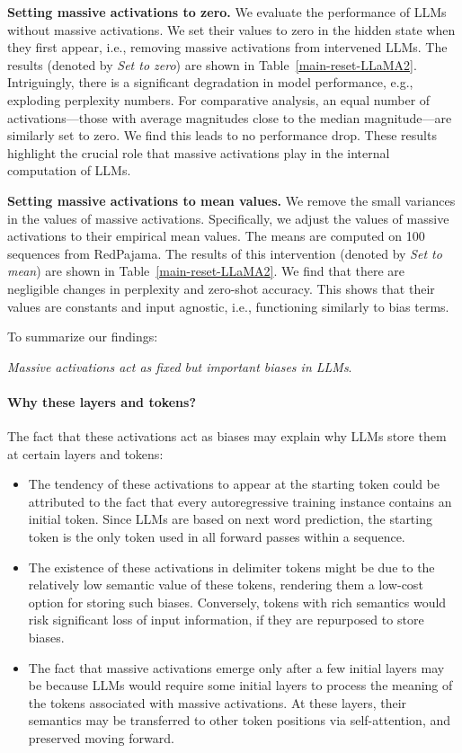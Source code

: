 \textbf{Setting massive activations to zero.} We evaluate the performance of LLMs without massive activations. We set their values to zero in the hidden state when they first appear, i.e., removing massive activations from intervened LLMs. The results (denoted by \textit{Set to zero}) are shown in Table~\ref{main-reset-LLaMA2}. Intriguingly, there is a significant degradation in model performance, e.g., exploding perplexity numbers. For comparative analysis, an equal number of activations---those with average magnitudes close to the median magnitude---are similarly set to zero. We find this leads to no performance drop. These results highlight the crucial role that massive activations play  in the internal computation of LLMs. 

\textbf{Setting massive activations to mean values.} We remove the small variances in the values of massive activations. Specifically, we adjust the values of massive activations to their empirical mean values. The means are computed on 100 sequences from RedPajama. The results of this intervention (denoted by \textit{Set to mean}) are shown in Table~\ref{main-reset-LLaMA2}. We find that there are negligible changes in perplexity and zero-shot accuracy. This shows that their values are constants and input agnostic, i.e., functioning similarly to bias terms.

To summarize our findings:

\begin{center}
    \textit{Massive activations act as fixed but important biases in LLMs}. 
\end{center}

\paragraph{Why these layers and tokens?} The fact that these activations act as biases may explain why LLMs store them at certain layers and tokens:

\begin{itemize}[topsep=-1.5pt,itemsep=-.5ex]
    \item The tendency of these activations to appear at the starting token could be attributed to the fact that every autoregressive training instance contains an initial token. Since LLMs are based on next word prediction, the starting token is the only token used in all forward passes within a sequence.
    \item The existence of these activations in delimiter tokens might be due to the relatively low semantic value of these tokens, rendering them a low-cost option for storing such biases. Conversely, tokens with rich semantics would risk significant loss of input information, if they are repurposed to store biases.
    \item The fact that massive activations emerge only after a few initial layers may be because LLMs would require some initial layers to process the meaning of the tokens associated with massive activations. At these layers, their semantics may be transferred to other token positions via self-attention, and preserved moving forward.
\end{itemize}

